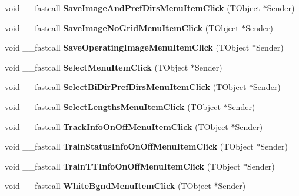 \begin{DoxyCompactItemize}
void \+\_\+\+\_\+fastcall {\bfseries Save\+Image\+And\+Pref\+Dirs\+Menu\+Item\+Click} (T\+Object $\ast$Sender)
\item 
\mbox{\label{class_t_interface_a69b645fe4cc36d0bea7de3fca553bd6a}} 
void \+\_\+\+\_\+fastcall {\bfseries Save\+Image\+No\+Grid\+Menu\+Item\+Click} (T\+Object $\ast$Sender)
\item 
\mbox{\label{class_t_interface_a4d75015545313004ffd5022c020f4edf}} 
void \+\_\+\+\_\+fastcall {\bfseries Save\+Operating\+Image\+Menu\+Item\+Click} (T\+Object $\ast$Sender)
\item 
\mbox{\label{class_t_interface_a6a0ecdd864e40a84b833014d4478d1e3}} 
void \+\_\+\+\_\+fastcall {\bfseries Select\+Menu\+Item\+Click} (T\+Object $\ast$Sender)
\item 
\mbox{\label{class_t_interface_a8ed3d3631b2d3235f1e011d595909eec}} 
void \+\_\+\+\_\+fastcall {\bfseries Select\+Bi\+Dir\+Pref\+Dirs\+Menu\+Item\+Click} (T\+Object $\ast$Sender)
\item 
\mbox{\label{class_t_interface_a60bb5e1b59c75a6ce602cded9e406249}} 
void \+\_\+\+\_\+fastcall {\bfseries Select\+Lengths\+Menu\+Item\+Click} (T\+Object $\ast$Sender)
\item 
\mbox{\label{class_t_interface_aa632441a0d33482eea24ae419a5bbf78}} 
void \+\_\+\+\_\+fastcall {\bfseries Track\+Info\+On\+Off\+Menu\+Item\+Click} (T\+Object $\ast$Sender)
\item 
\mbox{\label{class_t_interface_aecd6864bb750be6ce6b2ef9ac1e05db9}} 
void \+\_\+\+\_\+fastcall {\bfseries Train\+Status\+Info\+On\+Off\+Menu\+Item\+Click} (T\+Object $\ast$Sender)
\item 
\mbox{\label{class_t_interface_a7ced2edb8afc2ee7c58b11f0dfdac079}} 
void \+\_\+\+\_\+fastcall {\bfseries Train\+T\+T\+Info\+On\+Off\+Menu\+Item\+Click} (T\+Object $\ast$Sender)
\item 
\mbox{\label{class_t_interface_a3a9f9cf4b530f7958ee3d14047fd951a}} 
void \+\_\+\+\_\+fastcall {\bfseries White\+Bgnd\+Menu\+Item\+Click} (T\+Object $\ast$Sender)

\end{DoxyCompactItemize}
